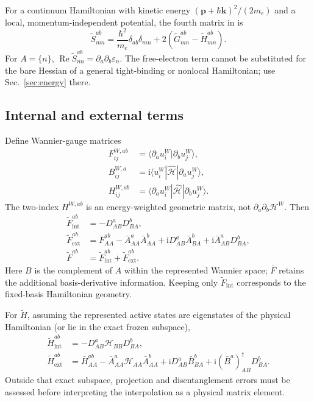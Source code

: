 \documentclass[prx,amsmath,amssymb,superscriptaddress,longbibliography]{revtex4-2}
\newcommand{\Rea}{\operatorname{Re}}
\newcommand{\ii}{\mathrm{i}}
\newcommand{\code}[1]{\texttt{\detokenize{#1}}}
\begin{document}
For a continuum Hamiltonian with kinetic energy $(\bm p+\hbar\bm k)^2/(2m_e)$
and a local, momentum-independent potential, the fourth matrix in
\code{Wannier.tex} is
\begin{equation}
 \widetilde S_{mn}^{ab}=\frac{\hbar^2}{m_e}\delta_{ab}\delta_{mn}
                  +2(\widetilde G_{mn}^{ab}-\widetilde H_{mn}^{ab}).
 \label{eq:S-continuum}
\end{equation}
For $A=\{n\}$, $\Rea\widetilde S_{nn}^{ab}=\partial_a\partial_b\varepsilon_n$.
The free-electron term cannot be substituted for the bare Hessian of a
general tight-binding or nonlocal Hamiltonian; use Sec.~\ref{sec:energy} there.

\subsection{Internal and external terms}
Define Wannier-gauge matrices
\begin{align}
 F_{ij}^{W,ab}&=\langle\partial_a u_i^W|\partial_b u_j^W\rangle,\nonumber\\
 B_{ij}^{W,a}&=\ii\langle u_i^W|\hat{\mathcal H}|\partial_a u_j^W\rangle,\nonumber\\
 H_{ij}^{W,ab}&=\langle\partial_a u_i^W|\hat{\mathcal H}|\partial_b u_j^W\rangle.
 \label{eq:external-data}
\end{align}
The two-index $H^{W,ab}$ is an energy-weighted geometric matrix,
not $\partial_a\partial_b\mathcal H^W$.
Then
\begin{align}
 \widetilde F^{ab}_{\mathrm{int}}
 &=-D_{AB}^aD_{BA}^b,\label{eq:Fint}\\
 \widetilde F^{ab}_{\mathrm{ext}}
 &=\bar F_{AA}^{ab}-\bar A_{AA}^a\bar A_{AA}^b
    +\ii D_{AB}^a\bar A_{BA}^b+\ii\bar A_{AB}^a D_{BA}^b,\label{eq:Fext}\\
 \widetilde F^{ab}&=\widetilde F^{ab}_{\mathrm{int}}+
                    \widetilde F^{ab}_{\mathrm{ext}}.
\end{align}
Here $B$ is the complement of $A$ within the represented Wannier space;
$\bar F$ retains the additional basis-derivative information.
Keeping only $\widetilde F_{\mathrm{int}}$ corresponds to the fixed-basis
Hamiltonian geometry.

For $\widetilde H$, assuming the represented active states are eigenstates
of the physical Hamiltonian (or lie in the exact frozen subspace),
\begin{align}
 \widetilde H^{ab}_{\mathrm{int}}&=-D_{AB}^a\mathcal H_{BB}D_{BA}^b,\nonumber\\
 \widetilde H^{ab}_{\mathrm{ext}}
 &=\bar H_{AA}^{ab}-\bar A_{AA}^a\mathcal H_{AA}\bar A_{AA}^b
    +\ii D_{AB}^a\bar B_{BA}^b
    +\ii(\bar B^a)^\dagger_{AB}D_{BA}^b.
 \label{eq:Hinterpolation}
\end{align}
Outside that exact subspace, projection and disentanglement errors must be
assessed before interpreting the interpolation as a physical matrix element.
\end{document}
